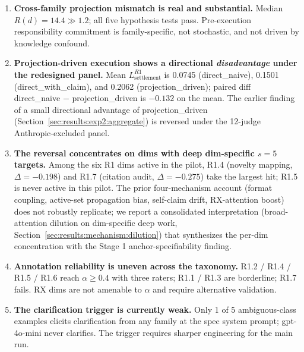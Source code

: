 \begin{enumerate}
    \item \textbf{Cross-family projection mismatch is real and substantial.} Median $R(d) = 14.4 \gg 1.2$; all five hypothesis tests pass. Pre-execution responsibility commitment is family-specific, not stochastic, and not driven by knowledge confound.

    \item \textbf{Projection-driven execution shows a directional \emph{disadvantage} under the redesigned panel.} Mean $L_{\text{settlement}}^{R1}$ is 0.0745 (direct\_naive), 0.1501 (direct\_with\_claim), and 0.2062 (projection\_driven); paired diff direct\_naive $-$ projection\_driven is $-0.132$ on the mean. The earlier finding of a small directional advantage of projection\_driven (Section~\ref{sec:results:exp2:aggregate}) is reversed under the 12-judge Anthropic-excluded panel.

    \item \textbf{The reversal concentrates on dims with deep dim-specific $s = 5$ targets.} Among the six R1 dims active in the pilot, R1.4 (novelty mapping, $\Delta = -0.198$) and R1.7 (citation audit, $\Delta = -0.275$) take the largest hit; R1.5 is never active in this pilot. The prior four-mechanism account (format coupling, active-set propagation bias, self-claim drift, RX-attention boost) does not robustly replicate; we report a consolidated interpretation (broad-attention dilution on dim-specific deep work, Section~\ref{sec:results:mechanism:dilution}) that synthesizes the per-dim concentration with the Stage 1 anchor-specifiability finding.

    \item \textbf{Annotation reliability is uneven across the taxonomy.} R1.2 / R1.4 / R1.5 / R1.6 reach $\alpha \geq 0.4$ with three raters; R1.1 / R1.3 are borderline; R1.7 fails. RX dims are not amenable to $\alpha$ and require alternative validation.

    \item \textbf{The clarification trigger is currently weak.} Only 1 of 5 ambiguous-class examples elicits clarification from any family at the spec system prompt; gpt-4o-mini never clarifies. The trigger requires sharper engineering for the main run.


\end{enumerate}
